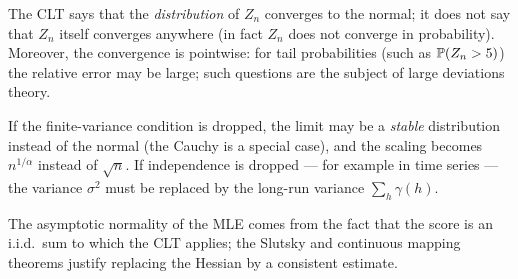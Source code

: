 \documentclass[main.tex]{subfiles}
\begin{document}
\begin{remark}
The CLT says that the \emph{distribution} of $Z_n$ converges to the normal; it does not say that $Z_n$ itself converges anywhere (in fact $Z_n$ does not converge in probability). Moreover, the convergence is pointwise: for tail probabilities (such as $\P(Z_n>5)$) the relative error may be large; such questions are the subject of large deviations theory.
\end{remark}

\begin{remark}
If the finite-variance condition is dropped, the limit may be a \emph{stable} distribution instead of the normal (the Cauchy is a special case), and the scaling becomes $n^{1/\alpha}$ instead of $\sqrt n$. If independence is dropped --- for example in time series --- the variance $\sigma^2$ must be replaced by the long-run variance $\sum_{h}\gamma(h)$.
\end{remark}

\begin{remark}
The asymptotic normality of the MLE comes from the fact that the score is an i.i.d.\ sum to which the CLT applies; the Slutsky and continuous mapping theorems justify replacing the Hessian by a consistent estimate.
\end{remark}

\end{document}
